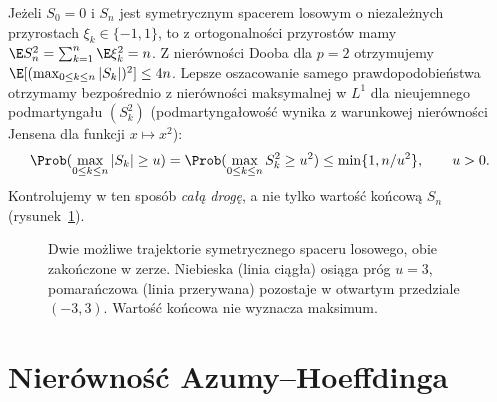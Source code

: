 \begin{przyklad}
Jeżeli $S_0=0$ i $S_n$ jest symetrycznym
spacerem losowym o niezależnych przyrostach
$\xi_k\in\{-1,1\}$, to z ortogonalności
przyrostów mamy $\E S_n^2=\sum_{k=1}^n\E\xi_k^2=n$.
Z nierówności Dooba dla $p=2$ otrzymujemy
$\E[(\max_{0\leq k\leq n}|S_k|)^2]\leq4n$.
Lepsze oszacowanie samego prawdopodobieństwa
otrzymamy bezpośrednio z nierówności maksymalnej
w $L^1$ dla nieujemnego podmartyngału $(S_k^2)$
(podmartyngałowość wynika z warunkowej nierówności
Jensena dla funkcji $x\mapsto x^2$):
\[
\Prob(\max_{0\leq k\leq n}|S_k|\geq u)
=\Prob(\max_{0\leq k\leq n}S_k^2\geq u^2)
\leq\min\{1,n/u^2\},\qquad u>0.
\]
Kontrolujemy w ten sposób \emph{całą drogę},
a nie tylko wartość końcową $S_n$ (rysunek~\ref{fig:rp1-14-max-paths}).
\end{przyklad}
\begin{figure}[htbp]
\centering
{}
\caption{Dwie możliwe trajektorie symetrycznego spaceru
losowego, obie zakończone w zerze. Niebieska
(linia ciągła) osiąga próg $u=3$, pomarańczowa
(linia przerywana) pozostaje w otwartym przedziale
$(-3,3)$. Wartość końcowa nie wyznacza maksimum.}
\label{fig:rp1-14-max-paths}
\end{figure}


\section{Nierówność Azumy--Hoeffdinga}

